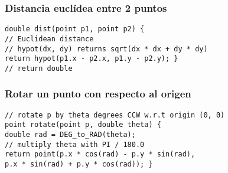\subsubsection{Distancia euclídea entre 2 puntos}
\begin{lstlisting}[style=C]
double dist(point p1, point p2) {
// Euclidean distance
// hypot(dx, dy) returns sqrt(dx * dx + dy * dy)
return hypot(p1.x - p2.x, p1.y - p2.y); }
// return double
\end{lstlisting}
\subsubsection{Rotar un punto con respecto al origen}
\begin{lstlisting}[style=C]
// rotate p by theta degrees CCW w.r.t origin (0, 0)
point rotate(point p, double theta) {
double rad = DEG_to_RAD(theta);
// multiply theta with PI / 180.0
return point(p.x * cos(rad) - p.y * sin(rad),
p.x * sin(rad) + p.y * cos(rad)); }
\end{lstlisting}
